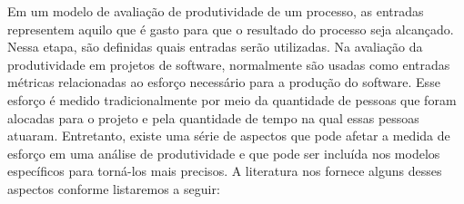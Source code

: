 Em um modelo de avaliação de produtividade de um processo, as entradas representem aquilo que é gasto para que o resultado do processo seja alcançado. Nessa etapa, são definidas quais entradas serão utilizadas. Na avaliação da produtividade em projetos de software, normalmente são usadas como entradas métricas relacionadas ao esforço necessário para a produção do software. Esse esforço é medido tradicionalmente por meio da quantidade de pessoas que foram alocadas para o projeto e pela quantidade de tempo na qual essas pessoas atuaram. Entretanto, existe uma série de aspectos que pode afetar a medida de esforço em uma análise de produtividade e que pode ser incluída nos modelos específicos para torná-los mais precisos. A literatura nos fornece alguns desses aspectos conforme listaremos a seguir:

\begin{itemize}


\end{itemize}
